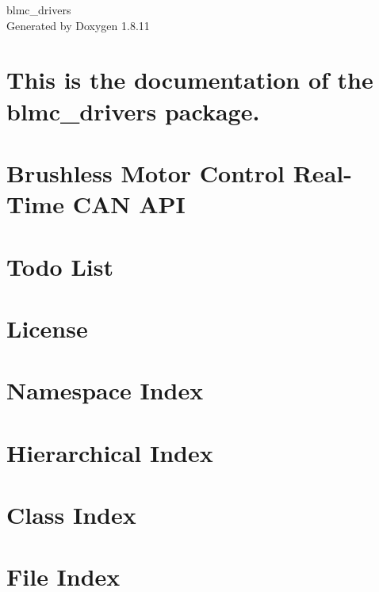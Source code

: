 \documentclass[twoside]{book}
\newcommand{\+}{\discretionary{\mbox{\scriptsize$\hookleftarrow$}}{}{}}
\newcommand{\clearemptydoublepage}{%
  \newpage{\pagestyle{empty}\cleardoublepage}%
}
\begin{document}
\hypersetup{pageanchor=false,
             bookmarksnumbered=true,
             pdfencoding=unicode
            }
\begin{titlepage}
\vspace*{7cm}
\begin{center}%
{\Large blmc\+\_\+drivers }\\
\vspace*{1cm}
{\large Generated by Doxygen 1.8.11}\\
\end{center}
\end{titlepage}
\clearemptydoublepage
\tableofcontents
\clearemptydoublepage
{}
\hypersetup{pageanchor=true}

\chapter{This is the documentation of the blmc\+\_\+drivers package.}
\label{index}\hypertarget{index}{}
\chapter{Brushless Motor Control Real-\/\+Time C\+AN A\+PI}
\label{md_README}
\hypertarget{md_README}{}

\chapter{Todo List}
\label{todo}
\hypertarget{todo}{}

\chapter{License}
\label{license}
\hypertarget{license}{}

\chapter{Namespace Index}

\chapter{Hierarchical Index}

\chapter{Class Index}

\chapter{File Index}

\end{document}

